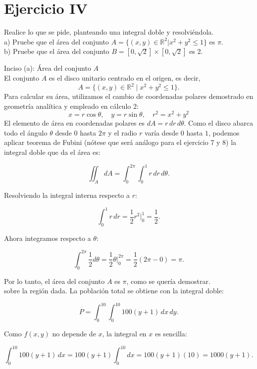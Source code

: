 \documentclass{article}
\begin{document}
\section*{Ejercicio IV}

Realice lo que se pide, planteando una integral doble y resolviéndola. \\

a) Pruebe que el área del conjunto \( A = \{(x,y) \in \mathbb{R}^2 | x^2 + y^2 \leq 1\} \) es \( \pi \).  \\

b) Pruebe que el área del conjunto \( B = [0, \sqrt{2}] \times [0, \sqrt{2}] \) es 2.

Inciso (a): Área del conjunto \( A \) \\
El conjunto \( A \) es el disco unitario centrado en el origen, es decir,  
\[
A = \{(x,y) \in \mathbb{R}^2 \mid x^2 + y^2 \leq 1\}.
\]  
Para calcular su área, utilizamos el cambio de coordenadas polares demostrado en geometría analítica y empleado en cálculo 2:  
\[
x = r\cos\theta, \quad y = r\sin\theta, \quad r^2 = x^2+y^2
\]  
El elemento de área en coordenadas polares es \( dA = r\, dr\, d\theta \). Como el disco abarca todo el ángulo \( \theta \) desde \( 0 \) hasta \( 2\pi \) y el radio \( r \) varía desde \( 0 \) hasta \( 1 \), podemos aplicar teorema de Fubini (nótese que será análogo para el ejercicio 7 y 8) la integral doble que da el área es:

\[
\iint_A dA = \int_0^{2\pi} \int_0^1 r\, dr\, d\theta.
\]

Resolviendo la integral interna respecto a \( r \):

\[
\int_0^1 r\, dr = \frac{1}{2} r^2 \Big|_0^1 = \frac{1}{2}.
\]

Ahora integramos respecto a \( \theta \):

\[
\int_0^{2\pi} \frac{1}{2} d\theta = \frac{1}{2} \theta \Big|_0^{2\pi} = \frac{1}{2} (2\pi - 0) = \pi.
\]

Por lo tanto, el área del conjunto \( A \) es \( \pi \), como se quería demostrar.\\



sobre la región dada. La población total se obtiene con la integral doble:

\[
P = \int_0^{10} \int_0^{10} 100(y+1) \,dx\, dy.
\]

Como \( f(x,y) \) no depende de \( x \), la integral en \( x \) es sencilla:

   \[
   \int_0^{10} 100(y+1) \,dx = 100(y+1) \int_0^{10} dx = 100(y+1)(10) = 1000(y+1).
   \]
\end{document}
